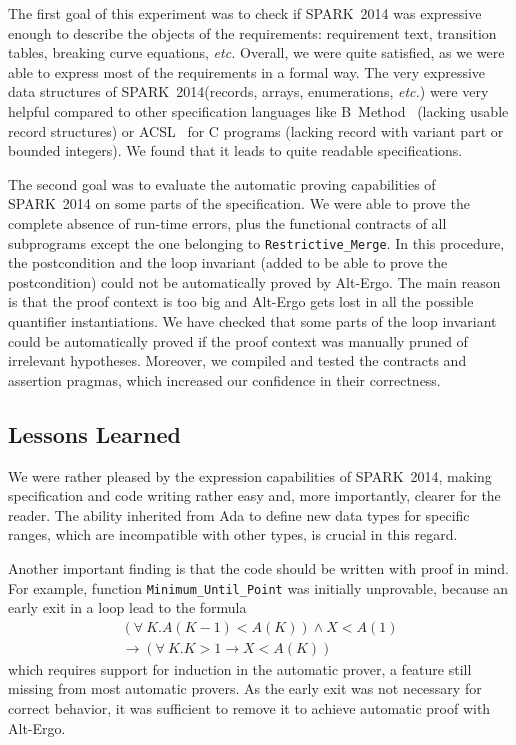 \documentclass[10pt,a4paper,twocolumn]{article}
\newcommand{\newspark}{SPARK~2014\xspace}
\newcommand{\altergo}{Alt-Ergo\xspace}
\newcommand{\etc}{\textit{etc.}\xspace}
\begin{document}
The first goal of this experiment was to check if \newspark was
expressive enough to describe the objects of the requirements:
requirement text, transition tables, breaking curve equations, \etc
Overall, we were quite satisfied, as we were able to express most of
the requirements in a formal way. The very expressive data structures
of \newspark (records, arrays, enumerations, \etc) were very helpful
compared to other specification languages like B~Method~\cite{b-book}
(lacking usable record structures) or ACSL~\cite{acsl} for C programs
(lacking record with variant part or bounded integers).  We found that
it leads to quite readable specifications.

The second goal was to evaluate the automatic proving capabilities of
\newspark on some parts of the specification. We were able to prove
the complete absence of run-time errors, plus the functional contracts of all
subprograms except the one belonging to \verb|Restrictive_Merge|. In this
procedure, the postcondition and the loop invariant (added to be able
to prove the postcondition) could not be automatically proved by
\altergo. The main reason is that the proof context is too big and
\altergo gets lost in all the possible quantifier instantiations. We
have checked that some parts of the loop invariant could be
automatically proved if the proof context was manually pruned of
irrelevant hypotheses. Moreover, we compiled and tested the contracts
and assertion pragmas, which increased our confidence in their
correctness.

\subsection{Lessons Learned}

We were rather pleased by the expression capabilities of \newspark,
making specification and code writing rather easy and, more
importantly, clearer for the reader. The ability inherited from Ada to
define new data types for specific ranges, which are incompatible with
other types, is crucial in this regard.

Another important finding is that the code should be written with
proof in mind. For example, function \verb|Minimum_Until_Point| was
initially unprovable, because an early exit in a loop lead to the
formula {\footnotesize
\begin{multline*}
(\forall~K. A(K-1)<A(K)) \wedge X<A(1) \\
\rightarrow (\forall~K. K>1 \rightarrow X<A(K))
\end{multline*}
}
which requires support for induction in the automatic prover, a
feature still missing from most automatic provers. As the early exit
was not necessary for correct behavior, it was sufficient to remove it
to achieve automatic proof with \altergo.
\end{document}
